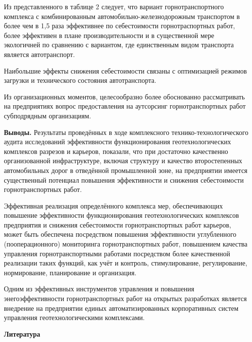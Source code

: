 \begin{multicols}{2}
Из представленного в таблице 2 следует, что вариант горнотранспортного
комплекса с комбинированным автомобильно-железнодорожным транспортом в
более чем в 1,5 раза эффективнее по себестоимости горнотраспортных
работ, более эффективен в плане производительности и в существенной мере
экологичней по сравнению с вариантом, где единственным видом транспорта
является автотранспорт.

Наибольшие эффекты снижения себестоимости связаны с оптимизацией режимов
загрузки и технического состояния автотранспорта.

Из организационных моментов, целесообразно более обоснованно
рассматривать на предприятиях вопрос предоставления на аутсорсинг
горнотранспортных работ субподрядным организациям.

{\bfseries Выводы.} Результаты проведённых в ходе комплексного
технико-технологического аудита исследований эффективности
функционирования геотехнологических комплексов разрезов и карьеров,
показали, что при достаточно качественно организованной инфраструктуре,
включая структуру и качество второстепенных автомобильных дорог в
отведённой промышленной зоне, на предприятии имеется существенный
потенциал повышения эффективности и снижения себестоимости
горнотранспортных работ.

Эффективная реализация определённого комплекса мер, обеспечивающих
повышение эффективности функционирования геотехнологических комплексов
предприятия и снижения себестоимости горнотранспортных работ карьеров,
может быть обеспечена посредством повышения эффективности углубленного
(пооперационного) мониторинга горнотранспортных работ, повышением
качества управления горнотранспортными работами посредством более
качественной реализации таких функций, как учёт и контроль,
стимулирование, регулирование, нормирование, планирование и организация.

Одним из эффективных инструментов управления и повышения
энегоэффективности горнотранспортных работ на открытых разработках
является внедрение на предприятии единых автоматизированных
корпоративных систем управления геотехнологическими комплексами.
\end{multicols}

\begin{center}
{\bfseries Литература}
\end{center}

